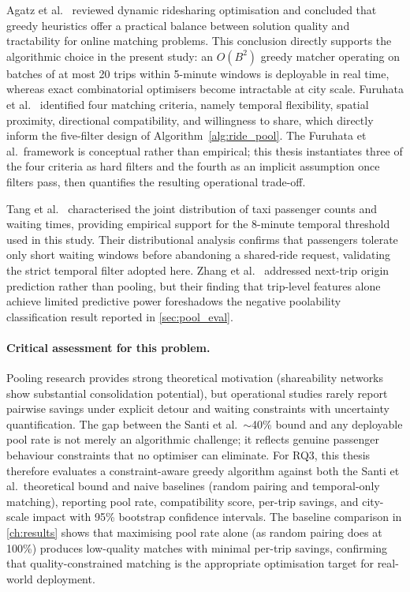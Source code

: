 Agatz et al.~\parencite{agatz2012ridesharing} reviewed dynamic ridesharing optimisation and concluded that greedy heuristics offer a practical balance between solution quality and tractability for online matching problems. This conclusion directly supports the algorithmic choice in the present study: an $O(B^2)$ greedy matcher operating on batches of at most 20 trips within 5-minute windows is deployable in real time, whereas exact combinatorial optimisers become intractable at city scale. Furuhata et al.~\parencite{furuhata2013ridesharing} identified four matching criteria, namely temporal flexibility, spatial proximity, directional compatibility, and willingness to share, which directly inform the five-filter design of Algorithm~\ref{alg:ride_pool}. The Furuhata et al.\ framework is conceptual rather than empirical; this thesis instantiates three of the four criteria as hard filters and the fourth as an implicit assumption once filters pass, then quantifies the resulting operational trade-off.

Tang et al.~\parencite{tang2018joint} characterised the joint distribution of taxi passenger counts and waiting times, providing empirical support for the 8-minute temporal threshold used in this study. Their distributional analysis confirms that passengers tolerate only short waiting windows before abandoning a shared-ride request, validating the strict temporal filter adopted here. Zhang et al.~\parencite{zhang2023deeptrip} addressed next-trip origin prediction rather than pooling, but their finding that trip-level features alone achieve limited predictive power foreshadows the negative poolability classification result reported in \autoref{sec:pool_eval}.

\paragraph{Critical assessment for this problem.} Pooling research provides strong theoretical motivation (shareability networks show substantial consolidation potential), but operational studies rarely report pairwise savings under explicit detour and waiting constraints with uncertainty quantification. The gap between the Santi et al.\ $\sim$40\% bound and any deployable pool rate is not merely an algorithmic challenge; it reflects genuine passenger behaviour constraints that no optimiser can eliminate. For RQ3, this thesis therefore evaluates a constraint-aware greedy algorithm against both the Santi et al.\ theoretical bound and naive baselines (random pairing and temporal-only matching), reporting pool rate, compatibility score, per-trip savings, and city-scale impact with 95\% bootstrap confidence intervals. The baseline comparison in \autoref{ch:results} shows that maximising pool rate alone (as random pairing does at 100\%) produces low-quality matches with minimal per-trip savings, confirming that quality-constrained matching is the appropriate optimisation target for real-world deployment.

